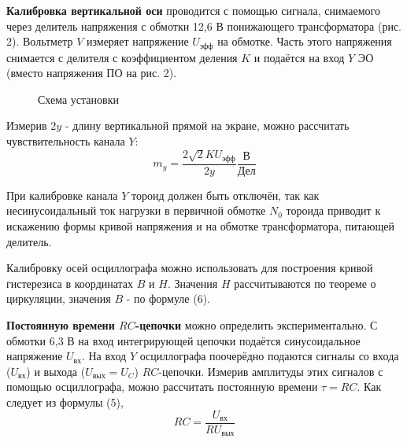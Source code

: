\documentclass[14pt]{article}
\begin{document}
\textbf{Калибровка вертикальной оси} проводится с помощью сигнала, снимаемого через делитель напряжения с обмотки 12,6 В понижающего трансформатора (рис. 2). Вольтметр $V$ измеряет напряжение $U_\text{эфф}$ на обмотке. Часть этого напряжения снимается с делителя с коэффициентом деления $K$ и подаётся на вход $Y$ ЭО (вместо напряжения ПО на рис. 2).

\begin{figure}[h!]
	\caption{Схема установки}
	\label{fig:image}
\end{figure}

Измерив $2y$ - длину вертикальной прямой на экране, можно рассчитать чувствительность канала $Y$:
\begin{equation}
m_y = \frac{2\sqrt{2}KU_\text{эфф}}{2y} \frac{\text{В}}{\text{Дел}}
\end{equation}

При калибровке канала $Y$ тороид должен быть отключён, так как несинусоидальный ток нагрузки в первичной обмотке $N_0$ тороида приводит к искажению формы кривой напряжения и на обмотке трансформатора, питающей делитель.

Калибровку осей осциллографа можно использовать для построения кривой гистерезиса в координатах $B$ и $H$. Значения $H$ рассчитываются по теореме о циркуляции, значения $B$ - по формуле (6).

\textbf{Постоянную времени $RC$-цепочки} можно определить экспериментально. С обмотки 6,3 В на вход интегрирующей цепочки подаётся синусоидальное напряжение $U_\text{вх}$. На вход $Y$ осциллографа поочерёдно подаются сигналы со входа ($U_\text{вх}$) и выхода ($U_\text{вых} = U_C$) $RC$-цепочки. Измерив амплитуды этих сигналов с помощью осциллографа, можно рассчитать постоянную времени $\tau = RC$. Как следует из формулы (5),
\begin{equation}
RC = \frac{U_\text{вх}}{RU_\text{вых}}
\end{equation}
\end{document}
